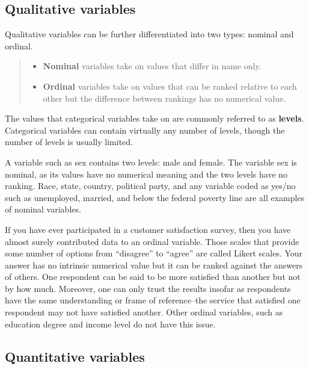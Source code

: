 \documentclass[
]{book}
\providecommand{\tightlist}{%
  \setlength{\itemsep}{0pt}\setlength{\parskip}{0pt}}
\begin{document}
\hypertarget{qualitative-variables}{%
\subsection{Qualitative variables}\label{qualitative-variables}}

Qualitative variables can be further differentiated into two types: nominal and ordinal.

\begin{quote}
\begin{itemize}
\tightlist
\item
  \textbf{Nominal} variables take on values that differ in name only.
\item
  \textbf{Ordinal} variables take on values that can be ranked relative to each other but the difference between rankings has no numerical value.
\end{itemize}
\end{quote}

The values that categorical variables take on are commonly referred to as \textbf{levels}. Categorical variables can contain virtually any number of levels, though the number of levels is usually limited.

A variable such as sex contains two levels: male and female. The variable sex is nominal, as its values have no numerical meaning and the two levels have no ranking. Race, state, country, political party, and any variable coded as yes/no such as unemployed, married, and below the federal poverty line are all examples of nominal variables.

If you have ever participated in a customer satisfaction survey, then you have almost surely contributed data to an ordinal variable. Those scales that provide some number of options from ``disagree'' to ``agree'' are called Likert scales. Your answer has no intrinsic numerical value but it can be ranked against the answers of others. One respondent can be said to be more satisfied than another but not by how much. Moreover, one can only trust the results insofar as respondents have the same understanding or frame of reference--the service that satisfied one respondent may not have satisfied another. Other ordinal variables, such as education degree and income level do not have this issue.

\hypertarget{quantitative-variables}{%
\subsection{Quantitative variables}\label{quantitative-variables}}
\end{document}

